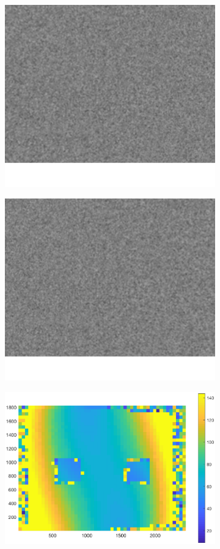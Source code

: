 \begin{figure}[h!]
	\centering
	\begin{subfigure}[t]{0.3\linewidth}
		\centering
		\includegraphics[width=0.8\linewidth]{figures/part2/test_left_2}
		\label{fig:test1}
	\end{subfigure}
	\begin{subfigure}[t]{0.3\linewidth}
		\centering
		\includegraphics[width=0.8\linewidth]{figures/part2/test_right_2}
		\label{fig:test2}
	\end{subfigure}
	\begin{subfigure}[t]{0.35\linewidth}
		\centering
		\includegraphics[width=1\linewidth]{figures/part2/test2_cmp}

\end{subfigure}
\end{figure}

